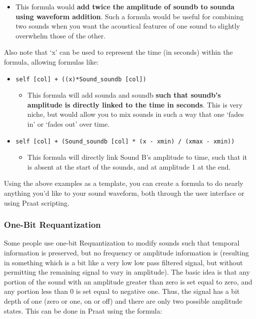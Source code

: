 \documentclass[11pt]{article}
\def\tightlist{}
\begin{document}
\begin{itemize}
  \begin{itemize}
  \tightlist
  \item
    This formula would \textbf{add twice the amplitude of soundb to
    sounda using waveform addition}. Such a formula would be useful for
    combining two sounds when you want the acoustical features of one
    sound to slightly overwhelm those of the other.
  \end{itemize}
\end{itemize}

Also note that `x' can be used to represent the time (in seconds) within
the formula, allowing formulas like:

\begin{itemize}
\tightlist
\item
  \texttt{self [col] + ((x)*Sound\_soundb [col])}

  \begin{itemize}
  \tightlist
  \item
    This formula will add sounda and soundb \textbf{such that soundb's
    amplitude is directly linked to the time in seconds}. This is very
    niche, but would allow you to mix sounds in such a way that one
    `fades in' or `fades out' over time.
  \end{itemize}
\item
  \texttt{self [col] + (Sound\_soundb [col] * (x - xmin) / (xmax - xmin))}

  \begin{itemize}
  \tightlist
  \item
    This formula will directly link Sound B's amplitude to time, such
    that it is absent at the start of the sounds, and at amplitude 1 at
    the end.
  \end{itemize}
\end{itemize}

Using the above examples as a template, you can create a formula to do
nearly anything you'd like to your sound waveform, both through the user
interface or using Praat scripting.

\hypertarget{one-bit-requantization}{%
\subsubsection{One-Bit Requantization}\label{one-bit-requantization}}

Some people use one-bit Requantization to modify sounds such that
temporal information is preserved, but no frequency or amplitude
information is (resulting in something which is a bit like a very low
low pass filtered signal, but without permitting the remaining signal to
vary in amplitude). The basic idea is that any portion of the sound with
an amplitude greater than zero is set equal to zero, and any portion
less than 0 is set equal to negative one. Thus, the signal has a bit
depth of one (zero or one, on or off) and there are only two possible
amplitude states. This can be done in Praat using the formula:
\end{document}
